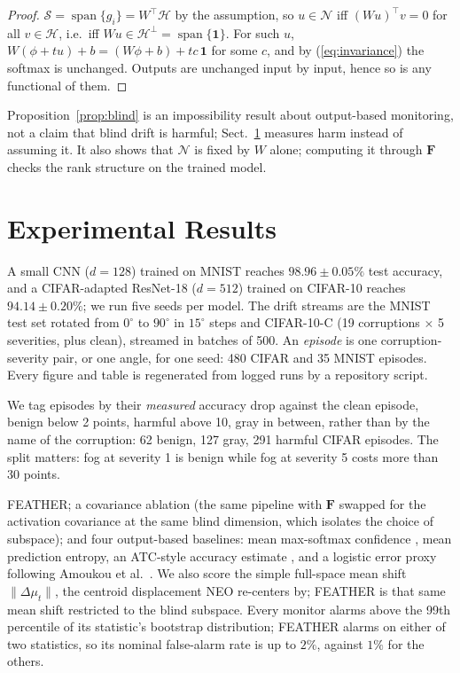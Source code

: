 \documentclass[graybox]{SNmult}
\newcommand{\F}{\mathbf{F}}
\newcommand{\act}{\phi}
\DeclareMathOperator{\spn}{span}
\begin{document}
\begin{proof}
$\mathcal{S} = \spn\{g_i\} = W^\top\!\mathcal{H}$ by the assumption, so
$u \in \mathcal{N}$ iff $(Wu)^\top v = 0$ for all $v \in \mathcal{H}$, i.e.\
iff $Wu \in \mathcal{H}^\perp = \spn\{\mathbf{1}\}$. For such $u$,
$W(\act + tu) + b = (W\act + b) + tc\,\mathbf{1}$ for some $c$, and by
(\ref{eq:invariance}) the softmax is unchanged. Outputs are unchanged input
by input, hence so is any functional of them.
\end{proof}

Proposition~\ref{prop:blind} is an impossibility result about output-based
monitoring, not a claim that blind drift is harmful; Sect.~\ref{sec:experiments}
measures harm instead of assuming it. It also shows that $\mathcal{N}$ is fixed
by $W$ alone; computing it through $\F$ checks the rank structure on the
trained model.

\section{Experimental Results}
\label{sec:experiments}

A small CNN ($d = 128$) trained on MNIST reaches $98.96 \pm 0.05\%$ test
accuracy, and a CIFAR-adapted ResNet-18 ($d = 512$) trained on CIFAR-10
reaches $94.14 \pm 0.20\%$; we run five seeds per model. The drift streams are
the MNIST test set rotated from $0^\circ$ to $90^\circ$ in $15^\circ$ steps and
CIFAR-10-C \cite{hendrycks2019benchmarking} (19 corruptions $\times$ 5
severities, plus clean), streamed in batches of 500. An \emph{episode} is one
corruption-severity pair, or one angle, for one seed: 480 CIFAR and 35 MNIST
episodes. Every figure and table is regenerated from logged runs by a repository script.

We tag episodes by their \emph{measured} accuracy drop against the clean
episode, benign below 2 points, harmful above 10, gray in between, rather than
by the name of the corruption: 62 benign, 127 gray, 291 harmful CIFAR episodes.
The split matters: fog at severity 1 is benign while fog at severity 5 costs
more than 30 points.

FEATHER; a covariance ablation (the same pipeline with $\F$ swapped for the
activation covariance at the same blind dimension, which isolates the choice
of subspace); and four output-based baselines: mean max-softmax confidence
\cite{hendrycks2017baseline}, mean prediction entropy, an ATC-style accuracy
estimate \cite{garg2022atc}, and a logistic error proxy following Amoukou
et al.\ \cite{amoukou2024sequential}. We also score the simple full-space mean shift
$\lVert\Delta\mu_t\rVert$, the centroid displacement NEO \cite{murphy2026neo}
re-centers by; FEATHER is that same mean shift restricted to the blind
subspace. Every monitor alarms above the 99th percentile of its statistic's
bootstrap distribution; FEATHER alarms on either of two statistics, so its
nominal false-alarm rate is up to $2\%$, against $1\%$ for the others.
\end{document}
